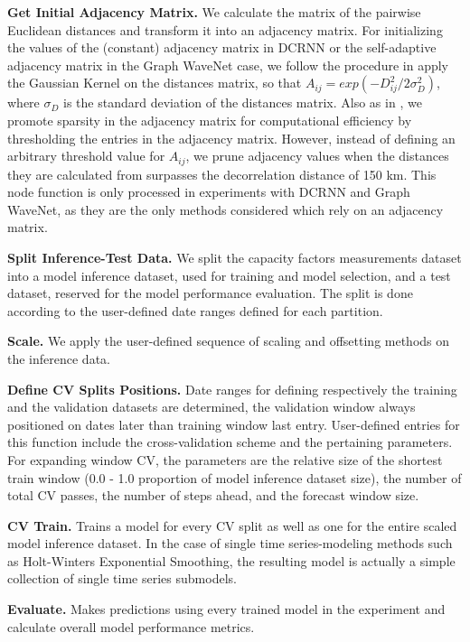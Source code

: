 \pagebreak

\vspace{1em}
\noindent
\textbf{Get Initial Adjacency Matrix.}  We calculate the matrix of the pairwise Euclidean distances and transform it into an adjacency matrix.
For initializing the values of the (constant) adjacency matrix in DCRNN or the self-adaptive adjacency matrix in the Graph WaveNet case, we follow the procedure in \cite{li2018dcrnn, wu2019graphwavenet} apply the Gaussian Kernel on the distances matrix, so that $A_{ij} = exp(-D_{ij}^2/2\sigma_{D}^2)$, where $\sigma_{D}$ is the standard deviation of the distances matrix.
Also as in \cite{DCRNN}, we promote sparsity in the adjacency matrix for computational efficiency by thresholding the entries in the adjacency matrix.
However, instead of defining an arbitrary threshold value for $A_{ij}$, we prune adjacency values when the distances they are calculated from surpasses the decorrelation distance of 150 km.
This node function is only processed in experiments with DCRNN and Graph WaveNet, as they are the only methods considered which rely on an adjacency matrix.

\vspace{1em}
\noindent
\textbf{Split Inference-Test Data.}  We split the capacity factors measurements dataset into a model inference dataset, used for training and model selection, and a test dataset, reserved for the model performance evaluation.
The split is done according to the user-defined date ranges defined for each partition.

\vspace{1em}
\noindent
\textbf{Scale.}  We apply the user-defined sequence of scaling and offsetting methods on the inference data.

\vspace{1em}
\noindent
\textbf{Define CV Splits Positions.}  Date ranges for defining respectively the training and the validation datasets are determined, the validation window always positioned on dates later than training window last entry.
User-defined entries for this function include the cross-validation scheme and the pertaining parameters.
For expanding window CV, the parameters are the relative size of the shortest train window (0.0 - 1.0 proportion of model inference dataset size), the number of total CV passes, the number of steps ahead, and the forecast window size.

\vspace{1em}
\noindent
\textbf{CV Train.}  Trains a model for every CV split as well as one for the entire scaled model inference dataset.
In the case of single time series-modeling methods such as Holt-Winters Exponential Smoothing, the resulting model is actually a simple collection of single time series submodels.

\vspace{1em}
\noindent
\textbf{Evaluate.}  Makes predictions using every trained model in the experiment and calculate overall model performance metrics.